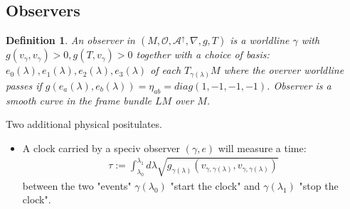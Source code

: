 \documentclass[10pt, oneside]{article}
\newtheorem{defn}{Definition}
\begin{document}
\subsection{Observers}
\begin{defn}
An observer in $(M,\mathcal{O},\mathcal{A}^\uparrow,\nabla,g,T)$ is a worldline $\gamma$ with $g(v_\gamma,v_\gamma)>0, g(T,v_\gamma)>0$ 
together with a choice of basis: $e_0 (\lambda),e_1 (\lambda),e_2 (\lambda),e_3 (\lambda)$ of each $T_{\gamma(\lambda)} M$ where the overver worldline passes if $g(e_a(\lambda),e_b(\lambda))=\eta_{ab}=diag(1,-1,-1,-1)$.
Observer is a smooth curve in the frame bundle $LM$ over $M$.
\end{defn}
Two additional physical positulates.
\begin{itemize}
\item A clock carried by a speciv observer $(\gamma,e)$ will measure a time:
\begin{align*}
\tau := \int_{\lambda_0}^{\lambda_1} d \lambda \sqrt{g_{\gamma(\lambda)}(v_{\gamma,\gamma(\lambda)},v_{\gamma,\gamma(\lambda)})}
\end{align*}
between the two "events" $\gamma(\lambda_0)$ "start the clock" and $\gamma(\lambda_1)$ "stop the clock".
\end{itemize}


\end{document}
